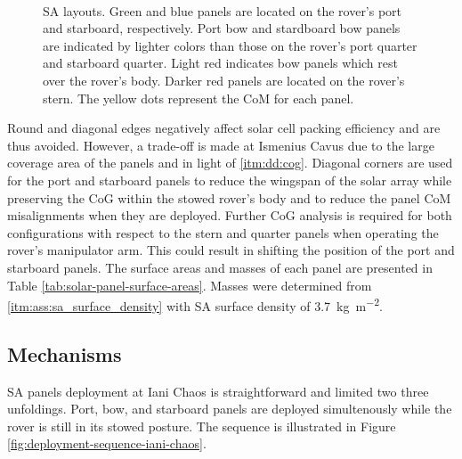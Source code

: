 \begin{figure}[h]
\begin{subfigure}[t]{\subfigureWidth}
		\label{fig:sub:solar-array-layouts-for-ismenius-cavus}
	\end{subfigure}\\[0.8ex]
    \caption[Solar array layouts]
            {\ac{SA} layouts. Green and blue panels are located on the rover's port and starboard, respectively. Port bow and stardboard bow panels are indicated by lighter colors than those on the rover's port quarter and starboard quarter. Light red indicates bow panels which rest over the rover's body. Darker red panels are located on the rover's stern. The yellow dots represent the \ac{CoM} for each panel.}
    \label{fig:solar-array-layouts-for-missions-sites}
\vspace{-2ex}
\end{figure}

\vspace{0.5cm}

Round and diagonal edges negatively affect solar cell packing efficiency and are thus avoided. However, a trade-off is made at Ismenius Cavus due to the large coverage area of the panels and in light of \ref{itm:dd:cog}. Diagonal corners are used for the port and starboard panels to reduce the wingspan of the solar array while preserving the \ac{CoG} within the stowed rover's body and to reduce the panel \ac{CoM} misalignments when they are deployed. Further \ac{CoG} analysis is required for both configurations with respect to the stern and quarter panels when operating the rover's manipulator arm. This could result in shifting the position of the port and starboard panels. The surface areas and masses of each panel are presented in Table \ref{tab:solar-panel-surface-areas}. Masses were determined from \ref{itm:ass:sa_surface_density} with \ac{SA} surface density of \SI{3.7}{kg.m^{-2}}.

\vspace{0.5cm}





\clearpage
\subsection{Mechanisms}

\ac{SA} panels deployment at Iani Chaos is straightforward and limited two three unfoldings. Port, bow, and starboard panels are deployed simultenously while the rover is still in its stowed posture. The sequence is illustrated in Figure \ref{fig:deployment-sequence-iani-chaos}.

